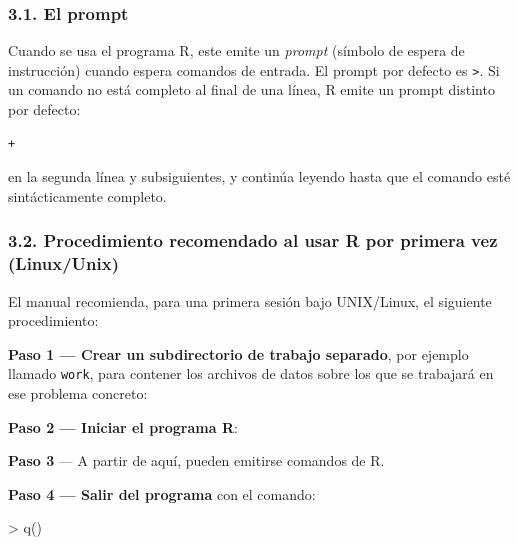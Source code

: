 \documentclass[
  jou,
  floatsintext,
  longtable,
  a4paper,
  nolmodern,
  notxfonts,
  notimes,
  12pt,
  colorlinks=true,linkcolor=blue,citecolor=blue,urlcolor=blue]{apa7}
\newenvironment{Shaded}{\begin{snugshade}}{\end{snugshade}}
\newcommand{\ExtensionTok}[1]{\textcolor[rgb]{0.00,0.23,0.31}{#1}}
\newcommand{\FunctionTok}[1]{\textcolor[rgb]{0.28,0.35,0.67}{#1}}
\newcommand{\NormalTok}[1]{\textcolor[rgb]{0.00,0.23,0.31}{#1}}
\newcommand{\SpecialCharTok}[1]{\textcolor[rgb]{0.37,0.37,0.37}{#1}}
\begin{document}
\subsubsection{3.1. El prompt}\label{el-prompt}

Cuando se usa el programa R, este emite un \emph{prompt} (símbolo de
espera de instrucción) cuando espera comandos de entrada. El prompt por
defecto es \texttt{\textgreater{}}. Si un comando no está completo al
final de una línea, R emite un prompt distinto por defecto:

\begin{verbatim}
+
\end{verbatim}

en la segunda línea y subsiguientes, y continúa leyendo hasta que el
comando esté sintácticamente completo.

\subsubsection{3.2. Procedimiento recomendado al usar R por primera vez
(Linux/Unix)}\label{procedimiento-recomendado-al-usar-r-por-primera-vez-linuxunix}

El manual recomienda, para una primera sesión bajo UNIX/Linux, el
siguiente procedimiento:

\textbf{Paso 1 --- Crear un subdirectorio de trabajo separado}, por
ejemplo llamado \texttt{work}, para contener los archivos de datos sobre
los que se trabajará en ese problema concreto:

\begin{Shaded}
\end{Shaded}

\textbf{Paso 2 --- Iniciar el programa R}:

\begin{Shaded}
\end{Shaded}

\textbf{Paso 3} --- A partir de aquí, pueden emitirse comandos de R.

\textbf{Paso 4 --- Salir del programa} con el comando:

\begin{Shaded}
\begin{Highlighting}[]
\SpecialCharTok{\textgreater{}} \FunctionTok{q}\NormalTok{()}
\end{Highlighting}
\end{Shaded}
\end{document}
